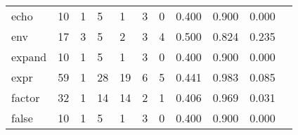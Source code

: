 \begin{longtable}{lp{1.2cm}p{1.2cm}p{1.2cm}p{1.2cm}p{1.2cm}p{1.2cm}p{1.2cm}p{1.2cm}p{1.2cm}p{1.2cm}}
echo      &                                    10 &                                                  1 &                                                  5 &                                                  1 &                                                  3 &                                                  0 &                                         0.400 &                                              0.900 &                                              0.000 \\
env       &                                    17 &                                                  3 &                                                  5 &                                                  2 &                                                  3 &                                                  4 &                                         0.500 &                                              0.824 &                                              0.235 \\
expand    &                                    10 &                                                  1 &                                                  5 &                                                  1 &                                                  3 &                                                  0 &                                         0.400 &                                              0.900 &                                              0.000 \\
expr      &                                    59 &                                                  1 &                                                 28 &                                                 19 &                                                  6 &                                                  5 &                                         0.441 &                                              0.983 &                                              0.085 \\
factor    &                                    32 &                                                  1 &                                                 14 &                                                 14 &                                                  2 &                                                  1 &                                         0.406 &                                              0.969 &                                              0.031 \\
false     &                                    10 &                                                  1 &                                                  5 &                                                  1 &                                                  3 &                                                  0 &                                         0.400 &                                              0.900 &                                              0.000 \\

\end{longtable}
